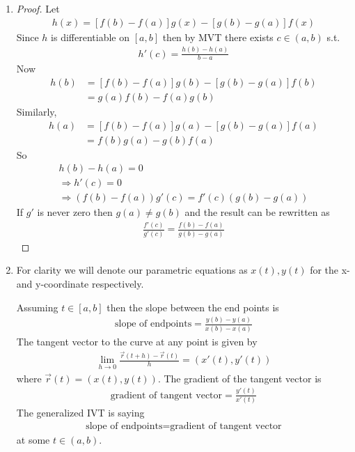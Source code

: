 \begin{enumerate}[label=(\alph*)]
    \item 
    \begin{proof}
        Let
        \begin{align*}
            h(x) = [f(b)-f(a)]g(x)-[g(b)-g(a)]f(x)
        \end{align*}
        Since $h$ is differentiable on $[a,b]$ then 
        by MVT there exists $c\in (a,b)$ s.t. 
        \begin{align*}
            h'(c) = \frac{h(b)-h(a)}{b-a}
        \end{align*}
        Now 
        \begin{align*}
            h(b) &= [f(b)-f(a)]g(b) - [g(b)-g(a)]f(b) \\
                &= g(a)f(b)-f(a)g(b)
        \end{align*}
        Similarly,
        \begin{align*}
            h(a) &= [f(b)-f(a)]g(a) - [g(b)-g(a)]f(a) \\
                &= f(b)g(a)-g(b)f(a)
        \end{align*}
        So 
        \begin{gather*}
            h(b)-h(a) = 0 \\
            \Rightarrow h'(c)=0 \\
            \Rightarrow (f(b)-f(a))g'(c) = f'(c)(g(b)-g(a))
        \end{gather*}
        If $g'$ is never zero then $g(a) \neq g(b)$ and the 
        result can be rewritten as  
        \begin{align*}
            \frac{f'(c)}{g'(c)} = \frac{f(b)-f(a)}{g(b)-g(a)}
        \end{align*}
    \end{proof}

    \item
    For clarity we will denote our parametric equations as
    $x(t), y(t)$ for the x- and y-coordinate respectively.

    Assuming $t\in [a,b]$ then the slope between the 
    end points is 
    \begin{align*}
        \text{slope of endpoints} = \frac{y(b)-y(a)}{x(b)-x(a)}
    \end{align*}
    The tangent vector to the curve at any point is 
    given by 
    \begin{align*}
        \lim_{h\rightarrow 0} \frac{\vec r(t+h)-\vec r(t)}{h} = (x'(t),y'(t))
    \end{align*}
    where $\vec r(t)=(x(t),y(t))$.
    The gradient of the tangent vector is 
    \begin{align*}
        \text{gradient of tangent vector} = \frac{y'(t)}{x'(t)}
    \end{align*}
    The generalized IVT is saying 
    \begin{align*}
        \text{slope of endpoints} = \text{gradient of tangent vector}
    \end{align*}
    at some $t\in (a,b)$.


\end{enumerate}
